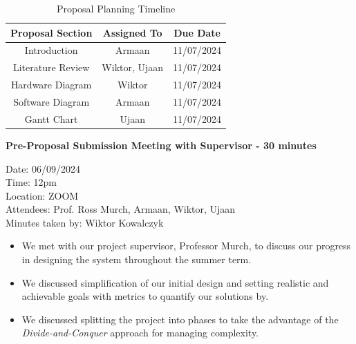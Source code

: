 \documentclass{article}
\begin{document}
\begin{table}[h]
    \centering
    \begin{tabular}{|c|c|c|}
        \hline
        \textbf{Proposal Section} & \textbf{Assigned To} & \textbf{Due Date} \\
        \hline
        Introduction & Armaan & 11/07/2024 \\
        \hline
        Literature Review & Wiktor, Ujaan & 11/07/2024 \\
        \hline
        Hardware Diagram & Wiktor & 11/07/2024 \\
        \hline
        Software Diagram & Armaan & 11/07/2024 \\
        \hline
        Gantt Chart & Ujaan & 11/07/2024 \\
        \hline
    \end{tabular}
    \caption{Proposal Planning Timeline}
    \label{tab:proposal_planning_timeline}
\end{table}

\vspace{0.5cm}

\textbf{Pre-Proposal Submission Meeting with Supervisor - 30 minutes}

Date: 06/09/2024 \\
Time: 12pm \\
Location: ZOOM \\
Attendees: Prof. Ross Murch, Armaan, Wiktor, Ujaan \\
Minutes taken by: Wiktor Kowalczyk

\begin{itemize}
    \item We met with our project supervisor, Professor Murch, to discuss our progress in designing the system throughout the summer term.
    \item We discussed simplification of our initial design and setting realistic and achievable goals with metrics to quantify our solutions by.
    \item We discussed splitting the project into phases to take the advantage of the \textit{Divide-and-Conquer} approach for managing complexity.
\end{itemize}
\end{document}
